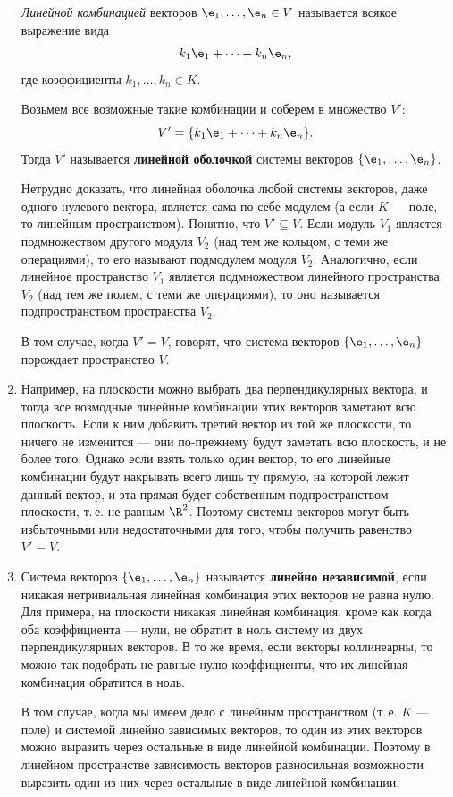 \begin{enumerate}
\textit{Линейной комбинацией} векторов $\e_1,\dots,\e_n\in V$ называется всякое выражение вида
$$
k_1\e_1+\dots+k_n\e_n,
$$
где коэффициенты $k_1,\dots, k_n\in K$.

Возьмем все возможные такие комбинации и соберем в множество $V'$:
$$
V'=\{k_1\e_1+\dots+k_n\e_n\}.
$$
Тогда $V'$ называется \textbf{линейной оболочкой} системы векторов $\{\e_1,\dots,\e_n\}$.

Нетрудно доказать, что линейная оболочка любой системы векторов, даже одного нулевого вектора, является сама по себе модулем (а если $K$ --- поле, то линейным пространством). Понятно, что $V'\subseteq V$. Если модуль $V_1$ является подмножеством другого модуля $V_2$ (над тем же кольцом, с теми же операциями), то его называют подмодулем модуля $V_2$. Аналогично, если линейное пространство $V_1$ является подмножеством линейного пространства $V_2$ (над тем же полем, с теми же операциями), то оно называется подпространством пространства $V_2$.

В том случае, когда $V'=V$, говорят, что система векторов $\{\e_1,\dots,\e_n\}$ порождает пространство $V$.

\item Например, на плоскости можно выбрать два перпендикулярных вектора, и тогда все возмодные линейные комбинации этих векторов заметают всю плоскость. Если к ним добавить третий вектор из той же плоскости, то ничего не изменится --- они по-прежнему будут заметать всю плоскость, и не более того. Однако если взять только один вектор, то его линейные комбинации будут накрывать всего лишь ту прямую, на которой лежит данный вектор, и эта прямая будет собственным подпространством плоскости, т.\,е. не равным $\R^2$. Поэтому системы векторов могут быть избыточными или недостаточными для того, чтобы получить равенство $V'=V$.


\item Система векторов $\{\e_1,\dots,\e_n\}$ называется \textbf{линейно независимой}, если никакая нетривиальная линейная комбинация этих векторов не равна нулю. Для примера, на плоскости никакая линейная комбинация, кроме как когда оба коэффициента --- нули, не обратит в ноль систему из двух перпендикулярных векторов. В то же время, если векторы коллинеарны, то можно так подобрать не равные нулю коэффициенты, что их линейная комбинация обратится в ноль. 

В том случае, когда мы имеем дело с линейным пространством (т.\,е. $K$ --- поле) и системой линейно зависимых векторов, то один из этих векторов можно выразить через остальные в виде линейной комбинации. Поэтому в линейном пространстве зависимость векторов равносильная возможности выразить один из них через остальные в виде линейной комбинации.


\end{enumerate}
